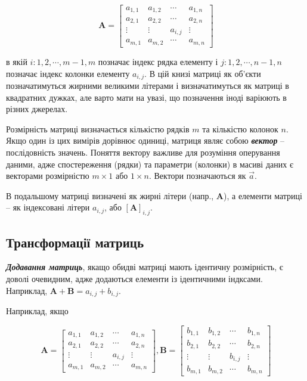 \documentclass[
  11pt,
]{book}
\begin{document}
\[\textbf{A} = \begin{bmatrix}
a_{1, 1} & a_{1,2} & \cdots & a_{1, n}\\
a_{2, 1} & a_{2,2} & \cdots & a_{2, n}\\
\vdots & \vdots & a_{i,j} & \vdots \\
a_{m, 1} & a_{m,2} & \cdots & a_{m, n}
\end{bmatrix}\]

в якій \(i: 1, 2, \cdots, m-1, m\) позначає індекс рядка елементу і \(j: 1, 2, \cdots, n-1, n\) позначає індекс колонки елементу \(a_{i, j}\). В цій книзі матриці як об'єкти позначатимуться жирними великими літерами і визначатимуться як матриці в квадратних дужках, але варто мати на увазі, що позначення іноді варіюють в різних джерелах.

Розмірність матриці визначається кількістю рядків \(m\) та кількістю колонок \(n\). Якщо один із цих вимірів дорівнює одиниці, матриця являє собою \textbf{\emph{вектор}} -- послідовність значень. Поняття вектору важливе для розуміння оперування даними, адже спостереження (рядки) та параметри (колонки) в масиві даних є векторами розмірністю \(m \times 1\) або \(1 \times n\). Вектори позначаються як \(\vec{a}\).

В подальшому матриці визначені як жирні літери (напр., \(\mathbf{A}\)), а елементи матриці -- як індексовані літери \(a_{i,j}\), або \([\mathbf{A}]_{i,j}\).

\subsection{Трансформації матриць}\label{ux442ux440ux430ux43dux441ux444ux43eux440ux43cux430ux446ux456ux457-ux43cux430ux442ux440ux438ux446ux44c}

\textbf{\emph{Додавання матриць}}, якащо обидві матриці мають ідентичну розмірність, є доволі очевидним, адже додаються елементи із ідентичними індксами. Наприклад, \(\mathbf{A}+\mathbf{B} = a_{i,j}+b_{i, j}\).

Наприклад, якщо

\[\mathbf{A} = \begin{bmatrix}
a_{1, 1} & a_{1,2} & \cdots & a_{1, n}\\
a_{2, 1} & a_{2,2} & \cdots & a_{2, n}\\
\vdots & \vdots & a_{i,j} & \vdots \\
a_{m, 1} & a_{m,2} & \cdots & a_{m, n}
\end{bmatrix},
\mathbf{B} = \begin{bmatrix}
b_{1, 1} & b_{1,2} & \cdots & b_{1, n}\\
b_{2, 1} & b_{2,2} & \cdots & b_{2, n}\\
\vdots & \vdots & b_{i,j} & \vdots \\
b_{m, 1} & b_{m,2} & \cdots & b_{m, n}
\end{bmatrix}\]
\end{document}
